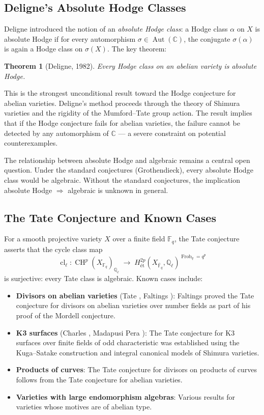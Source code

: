 \documentclass[11pt]{article}
\newtheorem{theorem}{Theorem}[section]
\theoremstyle{definition}
\DeclareMathOperator{\cl}{cl}
\DeclareMathOperator{\Frob}{Frob}
\DeclareMathOperator{\CH}{CH}
\DeclareMathOperator{\Aut}{Aut}
\begin{document}
\subsection{Deligne's Absolute Hodge Classes}

Deligne \cite{Deligne} introduced the notion of an \emph{absolute Hodge class}:
a Hodge class $\alpha$ on $X$ is absolute Hodge if for every automorphism
$\sigma \in \Aut(\mathbb{C})$, the conjugate $\sigma(\alpha)$ is again a
Hodge class on $\sigma(X)$.  The key theorem:

\begin{theorem}[Deligne, 1982]
Every Hodge class on an abelian variety is absolute Hodge.
\end{theorem}

This is the strongest unconditional result toward the Hodge conjecture for
abelian varieties.  Deligne's method proceeds through the theory of Shimura
varieties and the rigidity of the Mumford--Tate group action.  The result
implies that if the Hodge conjecture fails for abelian varieties, the failure
cannot be detected by any automorphism of $\mathbb{C}$ --- a severe constraint
on potential counterexamples.

The relationship between absolute Hodge and algebraic remains a central open
question.  Under the standard conjectures (Grothendieck), every absolute Hodge
class would be algebraic.  Without the standard conjectures, the implication
absolute Hodge $\Rightarrow$ algebraic is unknown in general.

\subsection{The Tate Conjecture and Known Cases}

For a smooth projective variety $X$ over a finite field $\mathbb{F}_q$, the
Tate conjecture asserts that the cycle class map
\[
  \cl_\ell : \CH^p(X_{\mathbb{F}_q})_{\mathbb{Q}_\ell}
  \;\longrightarrow\;
  H^{2p}_{\text{\'et}}(X_{\bar{\mathbb{F}}_q}, \mathbb{Q}_\ell)^{\Frob_q = q^p}
\]
is surjective: every Tate class is algebraic.  Known cases include:

\begin{itemize}
  \item \textbf{Divisors on abelian varieties} (Tate \cite{Tate}, Faltings
    \cite{Faltings}): Faltings proved the Tate conjecture for divisors on
    abelian varieties over number fields as part of his proof of the Mordell
    conjecture.
  \item \textbf{K3 surfaces} (Charles \cite{Charles}, Madapusi Pera
    \cite{MP}): The Tate conjecture for K3 surfaces over finite fields of
    odd characteristic was established using the Kuga--Satake construction
    and integral canonical models of Shimura varieties.
  \item \textbf{Products of curves}: The Tate conjecture for divisors on
    products of curves follows from the Tate conjecture for abelian varieties.
  \item \textbf{Varieties with large endomorphism algebras}: Various results
    for varieties whose motives are of abelian type.
\end{itemize}
\end{document}
